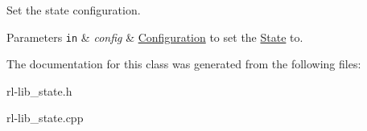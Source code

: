 Set the state configuration. 


\begin{DoxyParams}[1]{Parameters}
\mbox{\tt in}  & {\em config} & \hyperlink{classConfiguration}{Configuration} to set the \hyperlink{classState}{State} to. \\
\hline
\end{DoxyParams}


The documentation for this class was generated from the following files\-:\begin{DoxyCompactItemize}
\item 
rl-\/lib\-\_\-state.\-h\item 
rl-\/lib\-\_\-state.\-cpp\end{DoxyCompactItemize}

